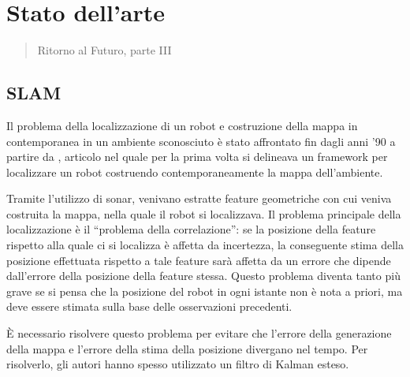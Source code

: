 \chapter{Stato dell'arte}
\label{capitolo2}
\thispagestyle{empty}

\begin{quotation}
{\footnotesize
{}
\begin{flushright}
Ritorno al Futuro, parte III
\end{flushright}
}
\end{quotation}
\vspace{0.5cm}

\section{SLAM}

Il problema della localizzazione di un robot e costruzione della mappa in contemporanea in un ambiente sconosciuto è stato affrontato fin dagli anni '90 a partire da \cite{174711}, articolo nel quale per la prima volta si delineava un framework per localizzare un robot costruendo contemporaneamente la mappa dell'ambiente.

Tramite l'utilizzo di sonar, venivano estratte feature geometriche con cui veniva costruita la mappa, nella quale il robot si localizzava. 
Il problema principale della localizzazione è il ``problema della correlazione'': se la posizione della feature rispetto alla quale ci si localizza è affetta da incertezza, la conseguente stima della posizione effettuata rispetto a tale feature sarà affetta da un errore che dipende dall'errore della posizione della feature stessa. 
Questo problema diventa tanto più grave se si pensa che la posizione del robot in ogni istante non è nota a priori, ma deve essere stimata sulla base delle osservazioni precedenti. 

\`E necessario risolvere questo problema per evitare che l'errore della generazione della mappa e l'errore della stima della posizione divergano nel tempo. 
Per risolverlo, gli autori hanno spesso utilizzato un filtro di Kalman esteso.

